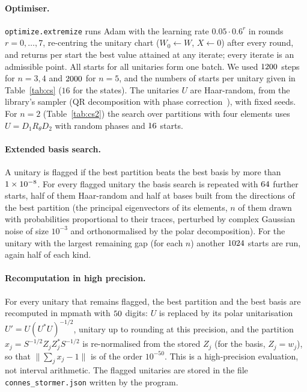 \documentclass[11pt]{article}
\theoremstyle{plain}
\theoremstyle{definition}
\theoremstyle{remark}
\begin{document}
\paragraph{Optimiser.} \texttt{optimize.extremize} runs Adam with the learning rate $0.05\cdot0.6^r$ in rounds $r=0,\dots,7$,
re-centring the unitary chart ($W_0\leftarrow W$, $X\leftarrow0$) after every round, and returns per start the best value
attained at any iterate; every iterate is an admissible point. All starts for all unitaries form one batch. We used
$1200$ steps for $n=3,4$ and $2000$ for $n=5$, and the numbers of starts per unitary given in Table~\ref{tab:cs}
($16$ for the states). The unitaries $U$ are Haar-random, from the library's sampler (QR decomposition with phase
correction~\cite{mezzadri2007}), with fixed seeds. For $n=2$ (Table~\ref{tab:cs2}) the search over partitions with four
elements uses $U=D_1R_\theta D_2$ with random phases and $16$ starts.

\paragraph{Extended basis search.} A unitary is flagged if the best partition beats the best basis by more than $1\times10^{-8}$. For
every flagged unitary the basis search is repeated with $64$ further starts, half of them Haar-random and half at
bases built from the directions of the best partition (the principal eigenvectors of its elements, $n$ of them drawn with
probabilities proportional to their traces, perturbed by complex Gaussian noise of size $10^{-3}$ and orthonormalised by the
polar decomposition). For the unitary with the largest remaining gap (for each $n$) another $1024$ starts are
run, again half of each kind.

\paragraph{Recomputation in high precision.} For every unitary that remains flagged, the best partition and the best basis
are recomputed in mpmath with $50$ digits: $U$ is replaced by its polar unitarisation $U'=U(U^*U)^{-1/2}$,
unitary up to rounding at this precision, and the partition $x_j=S^{-1/2}Z_jZ_j^*S^{-1/2}$ is re-normalised from the stored $Z_j$ (for the basis,
$Z_j=w_j$), so that $\|\sum_jx_j-1\|$ is of the order $10^{-50}$. This is a high-precision evaluation, not interval arithmetic.
The flagged unitaries are stored in the file \texttt{connes\_\allowbreak stormer.json} written by the program.
\end{document}
